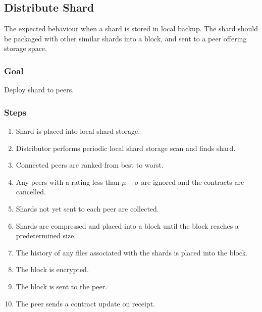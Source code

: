 \documentclass[11pt, a4paper, twoside]{report}
\begin{document}
\subsection{Distribute Shard}

The expected behaviour when a shard is stored in local backup. The shard should be packaged with other similar shards into a block, and sent to a peer offering storage space.

\subsubsection{Goal}

Deploy shard to peers.

\subsubsection{Steps}

\begin{enumerate}
 \item Shard is placed into local shard storage.
 \item Distributor performs periodic local shard storage scan and finds shard.
 \item Connected peers are ranked from best to worst.
 \item Any peers with a rating less than $\mu - \sigma$ are ignored and the contracts are cancelled.
 \item Shards not yet sent to each peer are collected.
 \item Shards are compressed and placed into a block until the block reaches a predetermined size.
 \item The history of any files associated with the shards is placed into the block.
 \item The block is encrypted.
 \item The block is sent to the peer.
 \item The peer sends a contract update on receipt.
\end{enumerate}
\end{document}
